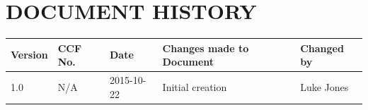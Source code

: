 \documentclass{project}
\begin{document}
\section*{DOCUMENT HISTORY}
\begin{tabular}{|l | l | l | l | l |}
\hline
Version & CCF No. & Date & Changes made to Document & Changed by \\
\hline
1.0 & N/A & 2015-10-22 & Initial creation & Luke Jones\\
\hline
\end{tabular}
\label{thelastpage}
\end{document}
